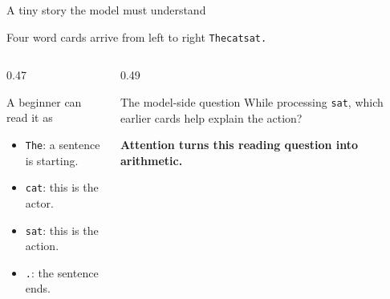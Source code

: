 \documentclass[aspectratio=169,11pt]{beamer}
\newcommand{\term}[1]{\textcolor{HUSTBlue}{\textbf{#1}}}
\begin{document}
\begin{frame}{A tiny story the model must understand}
  \begin{block}{Four word cards arrive from left to right}
    \centering
    \Large \texttt{The}\quad \texttt{cat}\quad \texttt{sat}\quad \texttt{.}
  \end{block}
  \begin{columns}[T,totalwidth=\textwidth]
    \begin{column}{0.47\textwidth}
      \begin{block}{A beginner can read it as}
        \begin{itemize}
          \item \texttt{The}: a sentence is starting.
          \item \texttt{cat}: this is the actor.
          \item \texttt{sat}: this is the action.
          \item \texttt{.}: the sentence ends.
        \end{itemize}
      \end{block}
    \end{column}
    \begin{column}{0.49\textwidth}
      \begin{block}{The model-side question}
        While processing \texttt{sat}, which earlier cards help explain the action?
      \end{block}
      \vspace{0.2cm}
      \term{Attention turns this reading question into arithmetic.}
    \end{column}
  \end{columns}
\end{frame}
\end{document}
